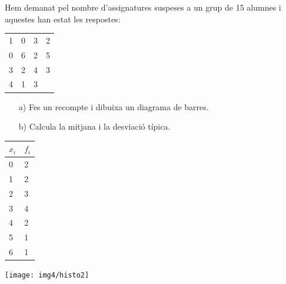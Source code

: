 	\begin{resolt}{Hem demanat pel nombre d'assignatures suspeses a un grup de 15 alumnes i aquestes han estat les respostes:\vspace{0.25cm}
			 \begin{center}
			 \begin{tabular}{cccc}
			 	1 & 0 & 3 & 2 \\
			 	0 & 6 & 2 & 5 \\
			 	3 & 2 & 4 & 3 \\
			 	4 & 1 & 3 & 	
			 \end{tabular}
		\end{center}
		\vspace{0.25cm}
		
			\begin{itemize}
				\item[a)]  Fes un recompte i dibuixa un diagrama de barres.
				
				\item[b)]  Calcula la mitjana i la desviació típica.
			\end{itemize}
		}
		
\begin{center}
\begin{minipage}{0.2\textwidth}
	\centering
	 	\begin{tabular}{|p{0.4in}|p{0.4in}|} \hline 
			$x_i$ & $f_i$ \\ \hline 
			0 & 2\\ \hline 
			1 & 2 \\ \hline 
			2 & 3 \\ \hline 
			3 & 4 \\ \hline 
			4 & 2 \\ \hline 
			5 & 1 \\ \hline 
			6 & 1  \\ \hline
		\end{tabular}
\end{minipage}	
\begin{minipage}{0.4\textwidth} 
	\centering
	\texttt{[image: img4/histo2]}
\end{minipage}
\end{center}

		\vspace{0.24cm}
		

\end{resolt}
